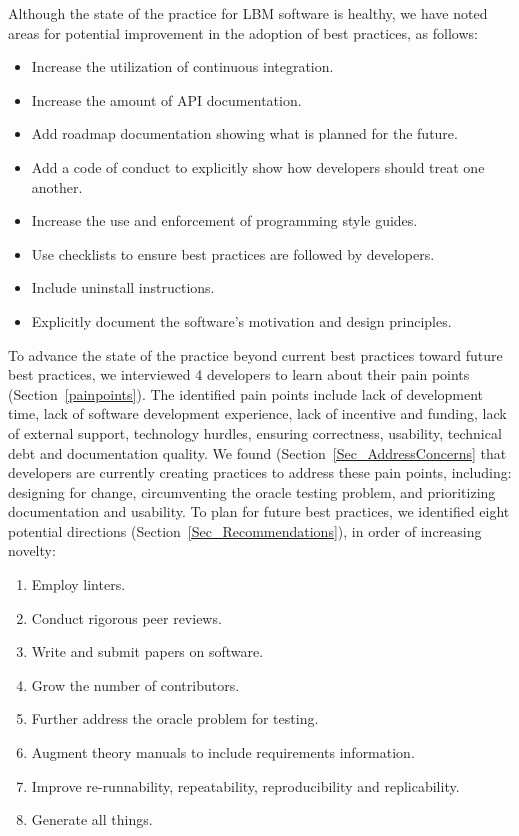 \documentclass[final, 3p, times, authoryear]{elsarticle}
\begin{document}
Although the state of the practice for LBM software is healthy, we have noted
areas for potential improvement in the adoption of best practices, as follows:

\begin{itemize}
	\item Increase the utilization of continuous integration.
	\item Increase the amount of API documentation.
	\item Add roadmap documentation showing what is planned for the future.
	\item Add a code of conduct to explicitly show how developers should treat
	one another.
	\item Increase the use and enforcement of programming style guides.
	\item Use checklists to ensure best practices are followed by developers.
	\item Include uninstall instructions.
	\item Explicitly document the software's motivation and design principles.
\end{itemize}

To advance the state of the practice beyond current best practices toward future
best practices, we interviewed 4 developers to learn about their pain points
(Section~\ref{painpoints}).  The identified pain points include lack of
development time, lack of software development experience, lack of incentive and
funding, lack of external support, technology hurdles, ensuring correctness,
usability, technical debt and documentation quality.  We found
(Section~\ref{Sec_AddressConcerns} that developers are currently creating
practices to address these pain points, including: designing for change,
circumventing the oracle testing problem, and prioritizing documentation and
usability.  To plan for future best practices, we identified eight
potential directions (Section~\ref{Sec_Recommendations}), in order of increasing
novelty:

\begin{enumerate}
	\item Employ linters.
	\item Conduct rigorous peer reviews.
	\item Write and submit papers on software.
	\item Grow the number of contributors.
	\item Further address the oracle problem for testing.
	\item Augment theory manuals to include requirements information.
	\item Improve re-runnability, repeatability, reproducibility and
	replicability.
	\item Generate all things.
\end{enumerate}
\end{document}
